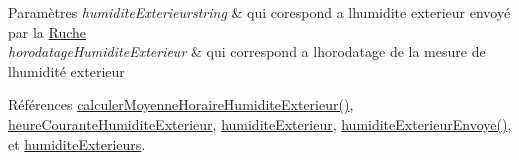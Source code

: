 \begin{DoxyParams}{Paramètres}
{\em humidite\+Exterieurstring} & qui corespond a l\textquotesingle{}humidite exterieur envoyé par la \hyperlink{class_ruche}{Ruche} \\
\hline
{\em horodatage\+Humidite\+Exterieur} & qui correspond a l\textquotesingle{}horodatage de la mesure de l\textquotesingle{}humidité exterieur \\
\hline
\end{DoxyParams}


Références \hyperlink{class_infos_humidite_afc4f6ba3cd4664118ef40f4c12b76506}{calculer\+Moyenne\+Horaire\+Humidite\+Exterieur()}, \hyperlink{class_infos_humidite_ad7b450373a47ec831872872e0e5674ad}{heure\+Courante\+Humidite\+Exterieur}, \hyperlink{class_infos_humidite_a503a9c849508928d3046292f17f37230}{humidite\+Exterieur}, \hyperlink{class_infos_humidite_a666d4bd12639460ea0fd2a3f483c2842}{humidite\+Exterieur\+Envoye()}, et \hyperlink{class_infos_humidite_a62d1331116ee1cf00cb8fa369a214c62}{humidite\+Exterieurs}.


